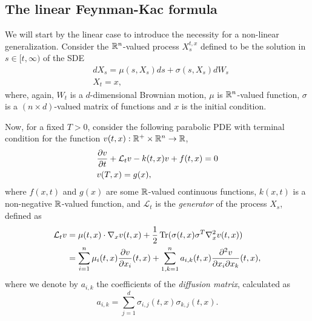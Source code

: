 \subsection{The linear Feynman-Kac formula}
We will start by the linear case to introduce the necessity for a non-linear generalization. Consider the $\mathbb{R}^n$-valued process $X_s^{t,x}$ defined to be the solution in $s\in[t,\infty)$ of the SDE 
\begin{equation}
	\label{eqn:FKprocess}
	\begin{split}
		&dX_s=\mu(s,X_s)ds+\sigma(s,X_s)dW_s\\
		&X_t=x,
	\end{split}
\end{equation}
where, again,  $W_t$ is a $d$-dimensional Brownian motion, $\mu$ is $\mathbb{R}^n$-valued function, $\sigma$ is a $(n\times d)$-valued matrix of functions and $x$ is the initial condition.

Now, for a fixed $T>0$, consider the following parabolic PDE with terminal condition for the function $v(t,x):\mathbb{R}^+\times \mathbb{R}^n\to \mathbb{R}$,
\begin{equation}
	\label{eqn:FKequation}
	\begin{split}
		&\frac{\partial v}{\partial t}+\mathcal{L}_t v-k(t,x) v+f(t,x)=0\\
		&v(T,x)=g(x),
	\end{split}
\end{equation}
where $f(x,t)$ and $g(x)$ are some $\mathbb{R}$-valued continuous functions, $k(x,t)$ is a non-negative $\mathbb{R}$-valued function, and $\mathcal{L}_t$ is the \textit{generator} of the process $X_s$, defined as
\begin{equation}
	\begin{split}
		\mathcal{L}_tv&=\mu(t,x)\cdot \nabla_x v(t,x)+\frac{1}{2}\operatorname{Tr}(\sigma(t,x)\sigma^{T}\nabla_x^2v(t,x))\\
		&=\sum_{i=1}^{n}\mu_i(t,x)\frac{\partial v}{\partial x_i}(t,x)+\sum_{1,k=1}^{n}a_{i,k}(t,x)\frac{\partial^2 v}{\partial x_i\partial x_k}(t,x),
	\end{split}
\end{equation} 
where we denote by $a_{i,k}$ the coefficients of the \textit{diffusion matrix}, calculated as 
\begin{equation}
	a_{i,k}=\sum_{j=1}^{d}\sigma_{i,j}(t,x)\sigma_{k,j}(t,x).
\end{equation}

